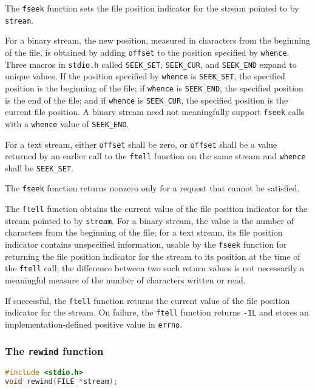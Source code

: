 The \texttt{fseek} function sets the file position indicator for the stream
pointed to by \texttt{stream}.

For a binary stream, the new position, measured in characters from the
beginning of the file, is obtained by adding \texttt{offset} to the position
specified by \texttt{whence}. Three macros in \texttt{stdio.h} called
\texttt{SEEK\_SET}, \texttt{SEEK\_CUR}, and \texttt{SEEK\_END} expand to unique
values. If the position specified by \texttt{whence} is \texttt{SEEK\_SET}, the
specified position is the beginning of the file; if \texttt{whence} is
\texttt{SEEK\_END}, the specified position is the end of the file; and if
\texttt{whence} is \texttt{SEEK\_CUR}, the specified position is the current
file position. A binary stream need not meaningfully support \texttt{fseek}
calls with a \texttt{whence} value of \texttt{SEEK\_END}.

For a text stream, either \texttt{offset} shall be zero, or \texttt{offset}
shall be a value returned by an earlier call to the \texttt{ftell} function on
the same stream and \texttt{whence} shall be \texttt{SEEK\_SET}.

The \texttt{fseek} function returns nonzero only for a request that cannot be
satisfied.

The \texttt{ftell} function obtains the current value of the file position
indicator for the stream pointed to by \texttt{stream}. For a binary stream,
the value is the number of characters from the beginning of the file; for a
text stream, its file position indicator contains unspecified information,
usable by the \texttt{fseek} function for returning the file position indicator
for the stream to its position at the time of the \texttt{ftell} call; the
difference between two such return values is not necessarily a meaningful
measure of the number of characters written or read.

If successful, the \texttt{ftell} function returns the current value of the
file position indicator for the stream. On failure, the \texttt{ftell} function
returns \texttt{-1L} and stores an implementation-defined positive value in
\texttt{errno}.

\subsubsection{The \texttt{rewind} function}
\lstset{basicstyle=\scriptsize, numbers=left, captionpos=b, tabsize=4}
\begin{lstlisting}[caption=Section \thesection listing \arabic{filecnt},language={C},
breaklines=true,xleftmargin=15pt,label=lst:section\thesection listing\arabic{filecnt}]
#include <stdio.h>
void rewind(FILE *stream);
\end{lstlisting}

